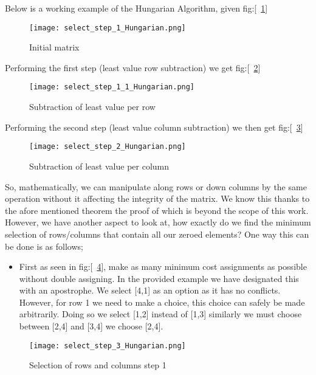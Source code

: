 Below is a working example of the Hungarian Algorithm, given fig:[~\ref{fig:select_step_1}]
  	
	\begin{figure}[H]
		\centering
		\caption{Initial matrix \label{fig:select_step_1}}
		\texttt{[image: select\_step\_1\_Hungarian.png]}
	\end{figure}
	
Performing the first step (least value row subtraction) we get fig:[~\ref{fig:select_step_1_1}]

	\begin{figure}[H]
		\centering
		\caption{Subtraction of least value per row \label{fig:select_step_1_1}}
		\texttt{[image: select\_step\_1\_1\_Hungarian.png]}
	\end{figure}

Performing the second step (least value column subtraction) we then get fig:[~\ref{fig:select_step_2}]

  	\begin{figure}[H]
		\centering
		\caption{Subtraction of least value per column \label{fig:select_step_2}}
		\texttt{[image: select\_step\_2\_Hungarian.png]}
	\end{figure}
	

So, mathematically, we can manipulate along rows or down columns by the same operation without it affecting
the integrity of the matrix.  We know this thanks to the afore mentioned theorem the proof of which is 
beyond the scope of this work.  However, we have another aspect to look at, how exactly do we find the 
minimum selection of rows/columns that contain all our zeroed elements? One way this can be done is as 
follows; \\

\begin{itemize}	
 \item First as seen in fig:[~\ref{fig:select_step_3}], make as many minimum cost assignments as possible 
 without double assigning.  In the provided example we have designated this with an apostrophe.  We select 
 [4,1] as an option as it has no conflicts.  However, for row 1 we need to make a choice, this choice can 
 safely be made arbitrarily.  Doing so we select [1,2] instead of [1,3] similarly we must choose between 
 [2,4] and [3,4] we choose [2,4].
\end{itemize}

  	\begin{figure}[H]
		\centering
		\caption{Selection of rows and columns step 1 \label{fig:select_step_3}}
		\texttt{[image: select\_step\_3\_Hungarian.png]}
	\end{figure}

